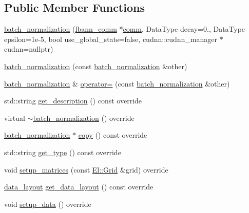 \subsection*{Public Member Functions}
\begin{DoxyCompactItemize}
\item 
\hyperlink{classlbann_1_1batch__normalization_a04f092712566fd732e5fc5e48ee16f4d}{batch\+\_\+normalization} (\hyperlink{classlbann_1_1lbann__comm}{lbann\+\_\+comm} $\ast$\hyperlink{file__io_8cpp_ab048c6f9fcbcfaa57ce68b00263dbebe}{comm}, Data\+Type decay=0., Data\+Type epsilon=1e-\/5, bool use\+\_\+global\+\_\+stats=false, cudnn\+::cudnn\+\_\+manager $\ast$cudnn=nullptr)
\item 
\hyperlink{classlbann_1_1batch__normalization_a62e642fc7c064a49826e5d4a10a87e5c}{batch\+\_\+normalization} (const \hyperlink{classlbann_1_1batch__normalization}{batch\+\_\+normalization} \&other)
\item 
\hyperlink{classlbann_1_1batch__normalization}{batch\+\_\+normalization} \& \hyperlink{classlbann_1_1batch__normalization_aeb3c03a8dd166a64a77a26ee06ba81cd}{operator=} (const \hyperlink{classlbann_1_1batch__normalization}{batch\+\_\+normalization} \&other)
\item 
std\+::string \hyperlink{classlbann_1_1batch__normalization_a331738f02157f9e1e21f212c41feb86c}{get\+\_\+description} () const override
\item 
virtual \hyperlink{classlbann_1_1batch__normalization_a6aeb06e13733560fb2203ea08df42632}{$\sim$batch\+\_\+normalization} () override
\item 
\hyperlink{classlbann_1_1batch__normalization}{batch\+\_\+normalization} $\ast$ \hyperlink{classlbann_1_1batch__normalization_af149d82996f351a5897a16a78ced113d}{copy} () const override
\item 
std\+::string \hyperlink{classlbann_1_1batch__normalization_a1a773049354935cc2841bea8aa8bd94f}{get\+\_\+type} () const override
\item 
void \hyperlink{classlbann_1_1batch__normalization_a4ddf27efaf48f0726dc4356a3a0b40a9}{setup\+\_\+matrices} (const \hyperlink{base_8hpp_a9951bb1719d534e0401b1f06cad19eab}{El\+::\+Grid} \&grid) override
\item 
\hyperlink{base_8hpp_a786677cbfb3f5677b4d84f3056eb08db}{data\+\_\+layout} \hyperlink{classlbann_1_1batch__normalization_ac97c038b9dec333a7fb285c196429e2d}{get\+\_\+data\+\_\+layout} () const override
\item 
void \hyperlink{classlbann_1_1batch__normalization_ac046a5ab567cc01f9a36c6b0fc4e3b55}{setup\+\_\+data} () override

\end{DoxyCompactItemize}
